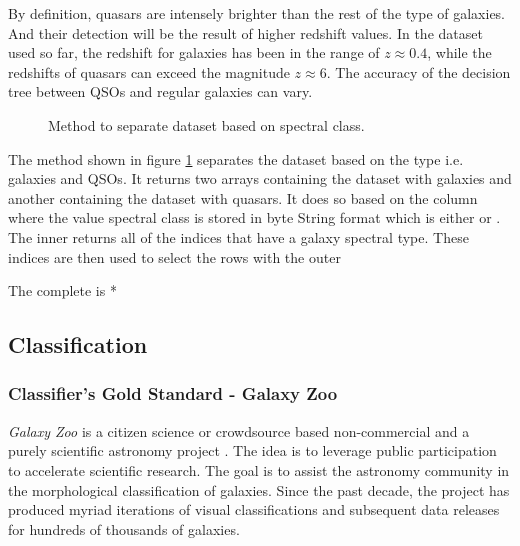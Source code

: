 By definition, quasars are intensely brighter than the rest of the type of galaxies. And their detection will be the result of higher redshift values. In the dataset used so far, the redshift for galaxies has been in the range of $z\approx0.4$, while the redshifts of quasars can exceed the magnitude $z\approx6$. The accuracy of the decision tree between QSOs and regular galaxies can vary.
\begin{figure}[H]
	\centering
	\caption{Method to separate dataset based on spectral class.}
	\label{fig:qso}
\end{figure}
The method  shown in figure \ref{fig:qso} separates the dataset based on the type i.e. galaxies and QSOs. It returns two   arrays containing the dataset with galaxies and another containing the dataset with quasars. It does so based on the column  where the value spectral class is stored in byte String format which is either  or . The inner  returns all of the indices that have a galaxy spectral type. These indices are then used to select the rows with the outer 

The complete is *



\subsection{Classification}
\subsubsection{Classifier's Gold Standard -  Galaxy Zoo}
\emph{Galaxy Zoo} is a citizen science or crowdsource based non-commercial and a purely scientific astronomy project \parencite{raddick_galaxy_2010, raddick_galaxy_2013}. The idea is to leverage public participation to accelerate scientific research. The goal is to assist the astronomy community in the morphological classification of galaxies. Since the past decade, the project has produced myriad iterations of visual classifications and subsequent data releases for hundreds of thousands of galaxies.

